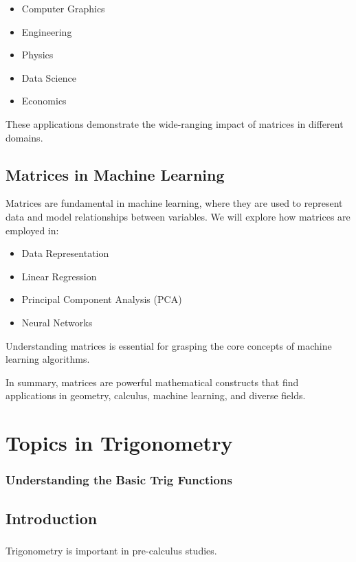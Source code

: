 \documentclass[a4paper,12pt]{book}
\begin{document}
\begin{itemize}
    \item Computer Graphics
    \item Engineering
    \item Physics
    \item Data Science
    \item Economics
\end{itemize}

These applications demonstrate the wide-ranging impact of matrices in different domains.

\section{Matrices in Machine Learning}

Matrices are fundamental in machine learning, where they are used to represent data and model relationships between variables. We will explore how matrices are employed in:

\begin{itemize}
    \item Data Representation
    \item Linear Regression
    \item Principal Component Analysis (PCA)
    \item Neural Networks
\end{itemize}

Understanding matrices is essential for grasping the core concepts of machine learning algorithms.

In summary, matrices are powerful mathematical constructs that find applications in geometry, calculus, machine learning, and diverse fields. 




\chapter{Topics in Trigonometry}
\subsection*{Understanding the Basic Trig Functions}

\section*{Introduction}
\paragraph{}
Trigonometry is important in pre-calculus studies.
\end{document}
